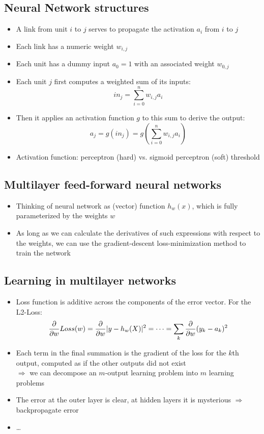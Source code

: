 \documentclass{scrartcl}
\DeclarePairedDelimiter\abs{\lvert}{\rvert}%
\begin{document}
\subsection{Neural Network structures}
\begin{itemize}
    \item
        A link from unit \(i\) to \(j\) serves to propagate the activation \(a_i\) from \(i\) to \(j\)
    \item
        Each link has a numeric weight \(w_{i,j}\)
    \item
        Each unit has a dummy input \(a_0 = 1\) with an associated weight \(w_{0,j}\)
    \item
        Each unit \(j\) first computes a weighted sum of its inputs: \[in_j = \sum_{i=0}^n w_{i,j} a_i\]
    \item
        Then it applies an activation function \(g\) to this sum to derive the output:
        \[a_j = g(in_j) = g(\sum_{i=0}^n w_{i,j} a_i)\]
    \item
        Activation function: perceptron (hard) vs. sigmoid perceptron (soft) threshold
\end{itemize}
\subsection{Multilayer feed-forward neural networks}
\begin{itemize}
    \item
        Thinking of neural network as (vector) function \(h_w(x)\), which is fully parameterized by the weights \(w\) 
    \item
        As long as we can calculate the derivatives of such expressions with respect to the weights, we can use the gradient-descent loss-minimization method to train the network
\end{itemize}
\subsection{Learning in multilayer networks}
\begin{itemize}
    \item
        Loss function is additive across the components of the error vector.
        For the L2-Loss: \[\frac{\partial}{\partial w} Loss(w) = \frac{\partial}{\partial w} \abs{y-h_w(X)}^2 = \dots = \sum_k \frac\partial{\partial w} (y_k - a_k)^2\] 
    \item
        Each term in the final summation is the gradient of the loss for the \(k\)th output, computed as if the other outputs did not exist\\
        \(\Rightarrow\) we can decompose an \(m\)-output learning problem into \(m\) learning problems
    \item
        The error at the outer layer is clear, at hidden layers it is mysterious \(\Rightarrow\) backpropagate error 
    \item
        \dots
\end{itemize}
\end{document}
